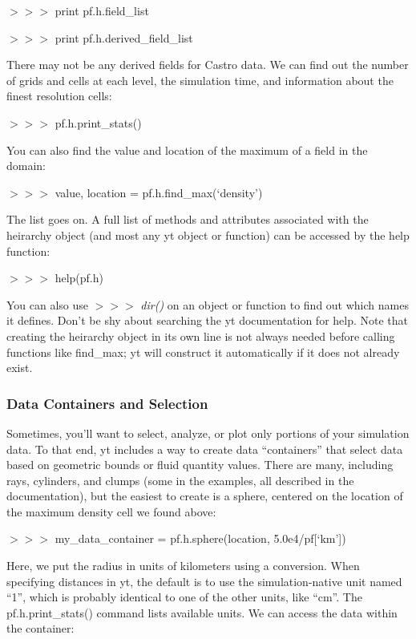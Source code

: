 {\scriptsize$>>>$} print pf.h.field\_list

{\scriptsize$>>>$} print pf.h.derived\_field\_list

There may not be any derived fields for Castro data. We can find out
the number of grids and cells at each level, the simulation time, and
information about the finest resolution cells:

{\scriptsize$>>>$} pf.h.print\_stats()

You can also find the value and location of the maximum of a field in
the domain:

{\scriptsize$>>>$} value, location = pf.h.find\_max(`density')

The list goes on. A full list of methods and attributes associated
with the heirarchy object (and most any yt object or function) can be
accessed by the help function:

{\scriptsize$>>>$} help(pf.h)

You can also use {\scriptsize$>>>$} {\it dir()} on an object or
function to find out which names it defines. Don't be shy about
searching the yt documentation for help. Note that creating the
heirarchy object in its own line is not always needed before calling
functions like find\_max; yt will construct it automatically if it
does not already exist.

\subsubsection{Data Containers and Selection}

Sometimes, you'll want to select, analyze, or plot only portions of
your simulation data. To that end, yt includes a way to create data
``containers'' that select data based on geometric bounds or fluid
quantity values. There are many, including rays, cylinders, and clumps
(some in the examples, all described in the documentation), but the
easiest to create is a sphere, centered on the location of the maximum
density cell we found above:

{\scriptsize$>>>$} my\_data\_container = pf.h.sphere(location, 5.0e4/pf[`km'])

Here, we put the radius in units of kilometers using a
conversion. When specifying distances in yt, the default is to use the
simulation-native unit named ``1'', which is probably identical to one
of the other units, like ``cm''. The pf.h.print\_stats() command lists
available units. We can access the data within the container:

